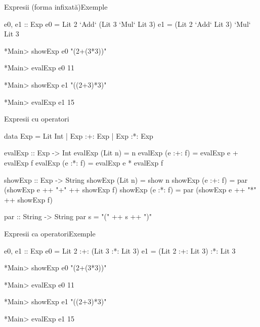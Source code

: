 \documentclass[xcolor=pdftex,romanian,colorlinks]{beamer}
\begin{document}
\begin{frame}[fragile]{Expresii (forma infixată)}{Exemple}
\begin{asciihs}
  e0, e1 :: Exp
  e0 = Lit 2 `Add` (Lit 3 `Mul` Lit 3)
  e1 = (Lit 2 `Add` Lit 3) `Mul` Lit 3

  *Main> showExp e0
  "(2+(3*3))"

  *Main> evalExp e0
  11

  *Main> showExp e1
  "((2+3)*3)"

  *Main> evalExp e1
  15
\end{asciihs}
\end{frame}
\begin{frame}[fragile]{Expresii cu operatori}
\begin{asciihs}
data   Exp   =   Lit Int
             |   Exp :+: Exp
             |   Exp :*: Exp

evalExp :: Exp -> Int
evalExp (Lit n)   = n
evalExp (e :+: f) = evalExp e + evalExp f
evalExp (e :*: f) = evalExp e * evalExp f

showExp :: Exp -> String
showExp (Lit n)   = show n
showExp (e :+: f) = par (showExp e ++ "+" ++ showExp f)
showExp (e :*: f) = par (showExp e ++ "*" ++ showExp f)

par :: String -> String
par s = "(" ++ s ++ ")"
\end{asciihs}
\end{frame}
\begin{frame}[fragile]{Expresii ca operatori}{Exemple}
\begin{asciihs}
  e0, e1 :: Exp
  e0 = Lit 2 :+: (Lit 3 :*: Lit 3)
  e1 = (Lit 2 :+: Lit 3) :*: Lit 3

  *Main> showExp e0
  "(2+(3*3))"

  *Main> evalExp e0
  11

  *Main> showExp e1
  "((2+3)*3)"

  *Main> evalExp e1
  15
\end{asciihs}
\end{frame}
\end{document}
